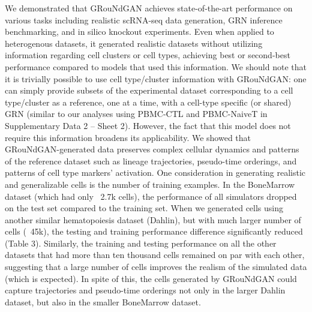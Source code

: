 We demonstrated that GRouNdGAN achieves state-of-the-art performance on various tasks including realistic scRNA-seq data generation, GRN inference benchmarking, and in silico knockout experiments. Even when applied to heterogenous datasets, it generated realistic datasets without utilizing information regarding cell clusters or cell types, achieving best or second-best performance compared to models that used this information. We should note that it is trivially possible to use cell type/cluster information with GRouNdGAN: one can simply provide subsets of the experimental dataset corresponding to a cell type/cluster as a reference, one at a time, with a cell-type specific (or shared) GRN (similar to our analyses using PBMC-CTL and PBMC-NaiveT in Supplementary Data 2 – Sheet 2). However, the fact that this model does not require this information broadens its applicability. We showed that GRouNdGAN-generated data preserves complex cellular dynamics and patterns of the reference dataset such as lineage trajectories, pseudo-time orderings, and patterns of cell type markers’ activation. One consideration in generating realistic and generalizable cells is the number of training examples. In the BoneMarrow dataset (which had only ~2.7k cells), the performance of all simulators dropped on the test set compared to the training set. When we generated cells using another similar hematopoiesis dataset (Dahlin), but with much larger number of cells (~45k), the testing and training performance difference significantly reduced (Table 3). Similarly, the training and testing performance on all the other datasets that had more than ten thousand cells remained on par with each other, suggesting that a large number of cells improves the realism of the simulated data (which is expected). In spite of this, the cells generated by GRouNdGAN could capture trajectories and pseudo-time orderings not only in the larger Dahlin dataset, but also in the smaller BoneMarrow dataset.

